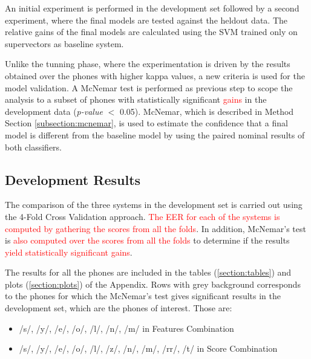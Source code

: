 An initial experiment is performed in the development set
followed by a second experiment, where
the final models are tested against the heldout data.
The relative gains of the final models
are calculated using the SVM trained only on supervectors as baseline system.


Unlike the tunning phase, where the experimentation is driven by the results obtained
over the phones with higher kappa values, a new criteria is used for the model validation.
A McNemar test is performed as previous step to scope the analysis
to a subset of phones with statistically significant \textcolor{red}{gains} in the development
data (\textit{p-value} $<$ 0.05).
McNemar, which is described in Method Section \ref{subsection:mcnemar},
is used to estimate the confidence that a final model is different from
the baseline model by using the paired nominal results of both classifiers.


\subsection{Development Results}

The comparison of the three systems
in the development set is carried out using the 4-Fold Cross Validation
approach. \textcolor{red}{The EER for each of
the systems is computed
by gathering the scores from all the folds}.
In addition, McNemar's test is \textcolor{red}{also computed
over the scores from all the folds} to determine if the
results \textcolor{red}{yield statistically significant gains}.

The results for all the phones are included in the tables
(\ref{section:tables}) and plots (\ref{section:plots})
of the Appendix. Rows with grey background corresponds to the phones for which
the McNemar's test gives significant results in the development set, which are the
phones of interest. Those are:

\begin{itemize}
	\item /s/, /y/, /e/, /o/, /l/, /n/, /m/ in Features Combination
	\item /s/, /y/, /e/, /o/, /l/, /z/, /n/, /m/, /rr/, /t/ in Score Combination
\end{itemize}

